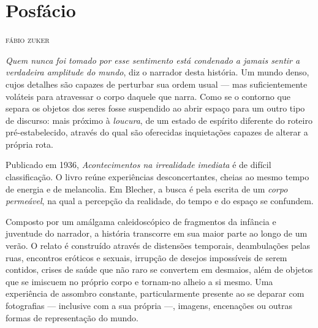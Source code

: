 
\chapter*{Posfácio\smallskip{}}

\begin{flushright}
\textsc{fábio zuker}
\end{flushright}

\noindent{}\textit{Quem nunca foi tomado por esse sentimento está condenado a jamais sentir a verdadeira amplitude do mundo}, diz o narrador desta história. Um mundo  denso, cujos detalhes são capazes de perturbar sua ordem usual --- mas suficientemente voláteis para atravessar o corpo daquele que narra. Como se o contorno que separa os objetos dos seres fosse suspendido ao abrir espaço para um outro tipo de discurso: mais próximo à \textit{loucura}, de um estado de espírito diferente do roteiro pré-estabelecido, através do qual são oferecidas inquietações capazes de alterar a própria rota.

Publicado em 1936, \textit{Acontecimentos na irrealidade imediata} é de difícil classificação. O livro reúne experiências desconcertantes, cheias ao mesmo tempo de energia e de melancolia. Em Blecher, a busca é pela escrita de um \textit{corpo permeável}, na qual a percepção da realidade, do tempo e do espaço se confundem. 


Composto por um amálgama caleidoscópico de fragmentos da infância e juventude do narrador, a história transcorre em sua maior parte ao longo de um verão. O relato é construído através de distensões temporais, deambulações pelas ruas, encontros eróticos e sexuais, irrupção de desejos impossíveis de serem contidos, crises de saúde que não raro se convertem em desmaios, além de objetos que se imiscuem no próprio corpo e tornam-no alheio a si mesmo. Uma experiência de assombro constante, particularmente presente ao se deparar com fotografias --- inclusive com a sua própria ---, imagens, encenações ou outras formas de representação do mundo.

